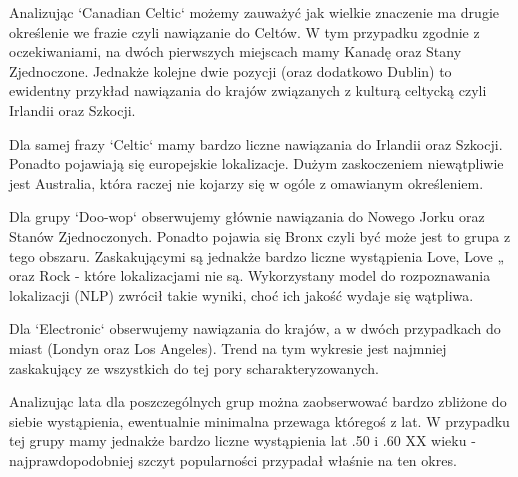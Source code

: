 \documentclass[journal]{article}
\begin{document}
\renewcommand{\namefile}{../Lucene_project/results/cat_loc/cat_loc_Canadian_Celtic.csv}
\renewcommand{\titleplot}{Najcześciej występujące lokalizacje dla grupy 'Canadian Celtic'}

Analizując `Canadian Celtic` możemy zauważyć jak wielkie znaczenie ma drugie określenie we
frazie czyli nawiązanie do Celtów. W tym przypadku zgodnie z oczekiwaniami,
na dwóch pierwszych miejscach mamy Kanadę oraz Stany Zjednoczone.
Jednakże kolejne dwie pozycji (oraz dodatkowo Dublin) to ewidentny
przykład nawiązania do krajów związanych z kulturą celtycką czyli Irlandii oraz Szkocji.

\renewcommand{\namefile}{../Lucene_project/results/cat_loc/cat_loc_Celtic.csv}
\renewcommand{\titleplot}{Najcześciej występujące lokalizacje dla grupy 'Celtic'}

Dla samej frazy `Celtic` mamy bardzo liczne nawiązania do Irlandii oraz Szkocji.
Ponadto pojawiają się europejskie lokalizacje. Dużym zaskoczeniem niewątpliwie
jest Australia, która raczej nie kojarzy się w ogóle z omawianym określeniem.

\renewcommand{\namefile}{../Lucene_project/results/cat_loc/cat_loc_Doo-wop.csv}
\renewcommand{\titleplot}{Najcześciej występujące lokalizacje dla grupy 'Doo-wop'}

Dla grupy `Doo-wop` obserwujemy głównie nawiązania do Nowego Jorku oraz Stanów Zjednoczonych.
Ponadto pojawia się Bronx czyli być może jest to grupa z tego obszaru.
 Zaskakującymi są jednakże bardzo liczne wystąpienia Love, Love „ oraz Rock - które lokalizacjami nie są.
Wykorzystany model do rozpoznawania lokalizacji (NLP) zwrócił takie wyniki, choć ich jakość wydaje się wątpliwa.

\renewcommand{\namefile}{../Lucene_project/results/cat_loc/cat_loc_Electronic.csv}
\renewcommand{\titleplot}{Najcześciej występujące lokalizacje dla grupy 'Electronic'}

Dla `Electronic` obserwujemy nawiązania do krajów, a w dwóch przypadkach do miast
(Londyn oraz Los Angeles). Trend na tym wykresie jest najmniej zaskakujący ze
wszystkich do tej pory scharakteryzowanych.

\renewcommand{\column}{Year}
\renewcommand{\labx}{Czas (rok)}
\renewcommand{\laby}{Wystąpienia}
\renewcommand{\namefile}{../Lucene_project/results/cat_time/cat_time_Doo-wop.csv}
\renewcommand{\titleplot}{Najcześciej występujące lata dla grupy 'Doo-wop'}

Analizując lata dla poszczególnych grup można zaobserwować bardzo zbliżone do siebie wystąpienia,
ewentualnie minimalna przewaga któregoś z lat. W przypadku tej grupy mamy jednakże
bardzo liczne wystąpienia lat .50 i .60 XX wieku - najprawdopodobniej
 szczyt popularności przypadał właśnie na ten okres.
\end{document}
